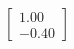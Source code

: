 \documentclass[preview]{standalone}
\begin{document}
\begin{align*}
\begin{bmatrix} 1.00 \\ -0.40 \end{bmatrix}
\end{align*}
\end{document}
